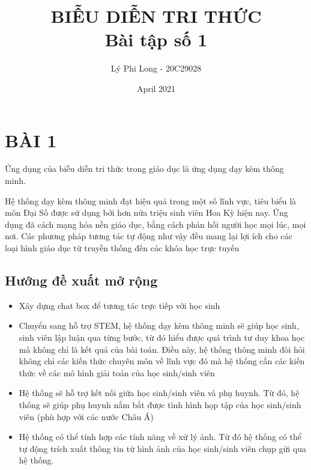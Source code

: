 \documentclass{article}
\title{BIỄU DIỄN TRI THỨC\\ Bài tập số 1}
\author{Lý Phi Long - 20C29028}
\date{April 2021}
\begin{document}
	\maketitle
	\section*{BÀI 1}
	Ứng dụng của biễu diễn tri thức trong giáo dục là ứng dụng dạy kèm thông minh.
	
	Hệ thống dạy kèm thông minh đạt hiệu quả trong một số lĩnh vực, tiêu biểu là môn Đại Số được sử dụng bởi hơn nửa triệu sinh viên Hoa Kỳ hiện nay. Ứng dụng đã cách mạng hóa nền giáo dục, bằng cách phản hồi người học mọi lúc, mọi nơi. Các phương pháp tương tác tự động như vậy đều mang lại lợi ích cho các loại hình giáo dục từ truyền thống đến các khóa học trực tuyến
	\subsection*{Hướng đề xuất mở rộng}
	\begin{itemize}
		\item Xây dựng chat box để tương tác trực tiếp với học sinh
		\item Chuyển sang hỗ trợ STEM, hệ thống dạy kèm thông minh sẽ giúp học sinh, sinh viên lập luận qua từng bước, từ đó hiểu được quá trình tư duy khoa học mà không chỉ là kết quả của bài toán. Điều này, hệ thống thông minh đòi hỏi không chỉ các kiến thức chuyên môn về  lĩnh vực đó mà hệ thống cần các kiến thức về các mô hình giải toán của học sinh/sinh viên
		\item Hệ thống sẽ hỗ trợ kết nối giữa học sinh/sinh viên và phụ huynh. Từ đó, hệ thống sẽ giúp phụ huynh nắm bắt được tình hình họp tập của học sinh/sinh viên (phù hợp với các nước Châu Á)
		\item Hệ thống có thể tính hợp các tính năng về xử lý ảnh. Từ đó hệ thống có thể tự động trích xuất thông tin từ hình ảnh của học sinh/sinh viên chụp gửi qua hệ thống.
		
	\end{itemize}
\end{document}
